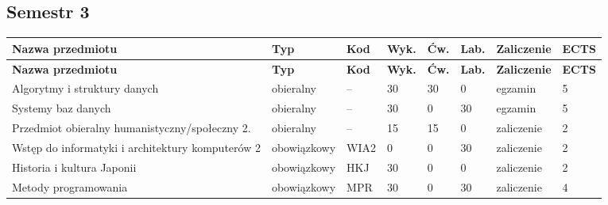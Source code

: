 \documentclass[12pt,a4paper]{article}
\newcommand{\thdrule}{\noalign{\global\setlength{\extrarowheight}{0pt}}}
\newcommand{\thdend}{\noalign{\global\setlength{\extrarowheight}{4pt}}}
\begin{document}
\subsection*{Semestr 3}

{\scriptsize
\begin{longtable}{>{\RaggedRight}m{5.0cm}m{1.9cm}m{0.75cm}m{0.85cm}m{0.85cm}m{0.85cm}m{1.45cm}m{0.9cm}}
\thdrule\toprule
\rowcolor{pjatkRed}
{\color{white}\footnotesize\textbf{\vphantom{Ag}Nazwa przedmiotu}} & {\color{white}\footnotesize\textbf{\vphantom{Ag}Typ}} & {\color{white}\footnotesize\textbf{\vphantom{Ag}Kod}} & {\color{white}\footnotesize\textbf{\vphantom{Ag}Wyk.}} & {\color{white}\footnotesize\textbf{\vphantom{Ag}Ćw.}} & {\color{white}\footnotesize\textbf{\vphantom{Ag}Lab.}} & {\color{white}\footnotesize\textbf{\vphantom{Ag}Zaliczenie}} & {\color{white}\footnotesize\textbf{\vphantom{Ag}ECTS}} \\
\midrule\thdend
\endfirsthead
\thdrule\toprule
\rowcolor{pjatkRed}
{\color{white}\footnotesize\textbf{\vphantom{Ag}Nazwa przedmiotu}} & {\color{white}\footnotesize\textbf{\vphantom{Ag}Typ}} & {\color{white}\footnotesize\textbf{\vphantom{Ag}Kod}} & {\color{white}\footnotesize\textbf{\vphantom{Ag}Wyk.}} & {\color{white}\footnotesize\textbf{\vphantom{Ag}Ćw.}} & {\color{white}\footnotesize\textbf{\vphantom{Ag}Lab.}} & {\color{white}\footnotesize\textbf{\vphantom{Ag}Zaliczenie}} & {\color{white}\footnotesize\textbf{\vphantom{Ag}ECTS}} \\
\midrule\thdend
\endhead
\rowcolor{tableElective} Algorytmy i struktury danych & {\scriptsize obieralny} & -- & 30 & 30 & 0 & {\scriptsize egzamin} & 5 \\
\rowcolor{tableElective} Systemy baz danych & {\scriptsize obieralny} & -- & 30 & 0 & 30 & {\scriptsize egzamin} & 5 \\
\rowcolor{tableElective} Przedmiot obieralny humanistyczny/społeczny 2. & {\scriptsize obieralny} & -- & 15 & 15 & 0 & {\scriptsize zaliczenie} & 2 \\
\rowcolor{tableRowAlt} Wstęp do informatyki i architektury komputerów 2 & {\scriptsize obowiązkowy} & WIA2 & 0 & 0 & 30 & {\scriptsize zaliczenie} & 2 \\
\rowcolor{tableRowLight} Historia i kultura Japonii & {\scriptsize obowiązkowy} & HKJ & 30 & 0 & 0 & {\scriptsize zaliczenie} & 2 \\
\rowcolor{tableRowAlt} Metody programowania & {\scriptsize obowiązkowy} & MPR & 30 & 0 & 30 & {\scriptsize zaliczenie} & 4 \\

\end{longtable}}
\end{document}
